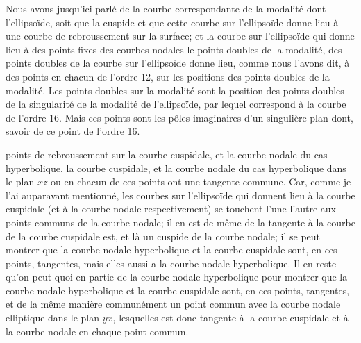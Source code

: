 \documentclass[11pt,a4paper]{book}
\begin{document}
Nous avons jusqu'ici parlé de la courbe correspondante de la modalité dont l'ellipsoïde, soit que la cuspide et que cette courbe sur l'ellipsoïde donne lieu à une courbe de rebroussement sur la surface; et la courbe sur l'ellipsoïde qui donne lieu à des points fixes des courbes nodales le points doubles de la modalité, des points doubles de la courbe sur l'ellipsoïde donne lieu, comme nous l'avons dit, à des points en chacun de l'ordre 12, sur les positions des points doubles de la modalité. Les points doubles sur la modalité sont la position des points doubles de la singularité de la modalité de l'ellipsoïde, par lequel correspond à la courbe de l'ordre 16. Mais ces points sont les pôles imaginaires d'un singulière plan dont, savoir de ce point de l'ordre 16.

\setcounter{page}{131}

points de rebroussement sur la courbe cuspidale, et la courbe nodale du cas hyperbolique, la courbe cuspidale, et la courbe nodale du cas hyperbolique dans le plan $xz$ ou en chacun de ces points ont une tangente commune. Car, comme je l'ai auparavant mentionné, les courbes sur l'ellipsoïde qui donnent lieu à la courbe cuspidale (et à la courbe nodale respectivement) se touchent l'une l'autre aux points communs de la courbe nodale; il en est de même de la tangente à la courbe de la courbe cuspidale est, et là un cuspide de la courbe nodale; il se peut montrer que la courbe nodale hyperbolique et la courbe cuspidale sont, en ces points, tangentes, mais elles aussi a la courbe nodale hyperbolique. Il en reste qu'on peut quoi en partie de la courbe nodale hyperbolique pour montrer que la courbe nodale hyperbolique et la courbe cuspidale sont, en ces points, tangentes, et de la même manière communément un point commun avec la courbe nodale elliptique dans le plan $yx$, lesquelles est donc tangente à la courbe cuspidale et à la courbe nodale en chaque point commun.

\setcounter{page}{132}
\end{document}

